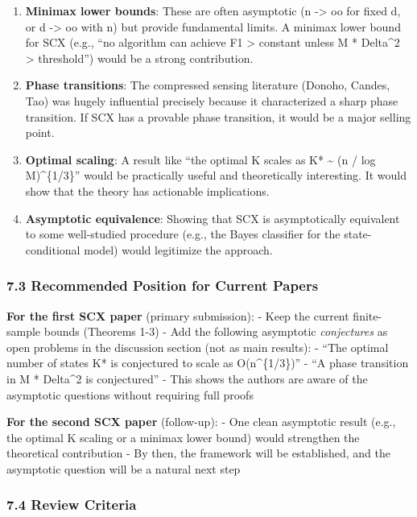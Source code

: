 \documentclass[
  12pt,
]{ctexart}
\begin{document}
\begin{enumerate}
\def\labelenumi{\arabic{enumi}.}
\item
  \textbf{Minimax lower bounds}: These are often asymptotic (n
  -\textgreater{} oo for fixed d, or d -\textgreater{} oo with n) but
  provide fundamental limits. A minimax lower bound for SCX (e.g., ``no
  algorithm can achieve F1 \textgreater{} constant unless M * Delta\^{}2
  \textgreater{} threshold'') would be a strong contribution.
\item
  \textbf{Phase transitions}: The compressed sensing literature (Donoho,
  Candes, Tao) was hugely influential precisely because it characterized
  a sharp phase transition. If SCX has a provable phase transition, it
  would be a major selling point.
\item
  \textbf{Optimal scaling}: A result like ``the optimal K scales as K*
  \textasciitilde{} (n / log M)\^{}\{1/3\}'' would be practically useful
  and theoretically interesting. It would show that the theory has
  actionable implications.
\item
  \textbf{Asymptotic equivalence}: Showing that SCX is asymptotically
  equivalent to some well-studied procedure (e.g., the Bayes classifier
  for the state-conditional model) would legitimize the approach.
\end{enumerate}

\subsubsection{7.3 Recommended Position for Current
Papers}\label{recommended-position-for-current-papers}

\textbf{For the first SCX paper} (primary submission): - Keep the
current finite-sample bounds (Theorems 1-3) - Add the following
asymptotic \emph{conjectures} as open problems in the discussion section
(not as main results): - ``The optimal number of states K* is
conjectured to scale as O(n\^{}\{1/3\})'' - ``A phase transition in M *
Delta\^{}2 is conjectured'' - This shows the authors are aware of the
asymptotic questions without requiring full proofs

\textbf{For the second SCX paper} (follow-up): - One clean asymptotic
result (e.g., the optimal K scaling or a minimax lower bound) would
strengthen the theoretical contribution - By then, the framework will be
established, and the asymptotic question will be a natural next step

\subsubsection{7.4 Review Criteria}\label{review-criteria}
\end{document}
